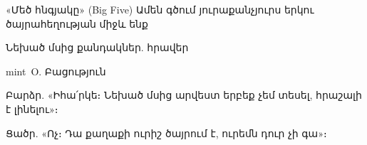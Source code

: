 \begin{frame}{«Մեծ հնգյակը» (Big Five)}
  \centering
  {\small Ամեն գծում յուրաքանչյուրս երկու ծայրահեղության միջև ենք}\par\smallskip
  
\end{frame}

\begin{frame}{Նեխած մսից քանդակներ. հրավեր}
  \begin{traitbox}{mint}{\ O. Բացություն}
    \begin{minipage}[t]{0.48\linewidth}\raggedright
      {\blackfont Բարձր.} «Իհա՛րկե։ Նեխած մսից արվեստ երբեք չեմ տեսել, հրաշալի է լինելու»։
    \end{minipage}\hfill
    \begin{minipage}[t]{0.48\linewidth}\raggedright
      {\blackfont Ցածր.} «Ոչ։ Դա քաղաքի ուրիշ ծայրում է, ուրեմն դուր չի գա»։
    \end{minipage}
  \end{traitbox}
\end{frame}

